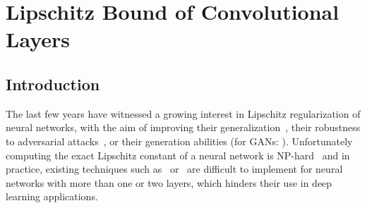 \chapter{Lipschitz Bound of Convolutional Layers}
\label{chapter:ch5-lipschitz_bound}
\localtoc



\section{Introduction}
\label{section:ch5-introduction}


The last few years have witnessed a growing interest in Lipschitz regularization of neural networks, with the aim of improving their generalization~\cite{bartlett2017spectrally}, their robustness to adversarial attacks~\cite{tsuzuku2018lipschitz, farnia2018generalizable}, or their generation abilities (\eg for GANs: \citealt{miyato2018spectral,arjovsky2017wasserstein}).
Unfortunately computing  the exact Lipschitz constant of a neural network is NP-hard~\cite{scaman2018lipschitz} and in practice, existing techniques such as~\citet{scaman2018lipschitz, fazlyab2019efficient} or~\citet{latorre2020lipschitz} are difficult to implement for neural networks with more than one or two layers, which hinders their use in deep learning applications.

